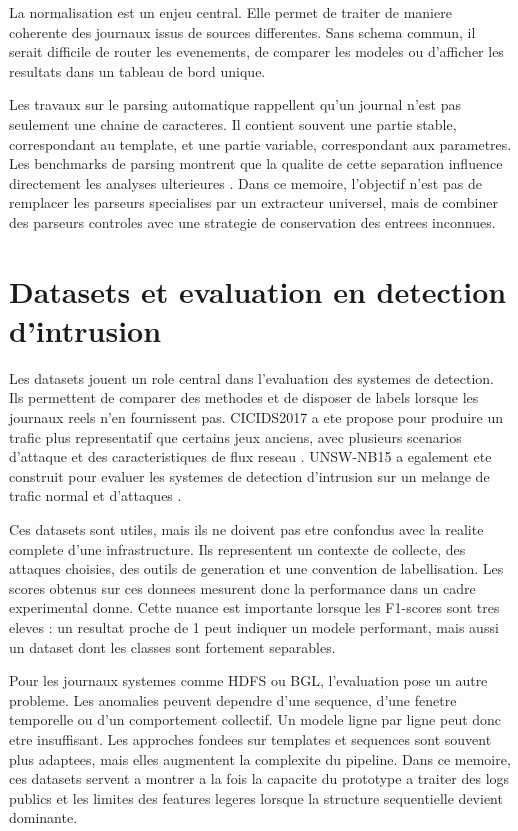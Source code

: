 La normalisation est un enjeu central. Elle permet de traiter de maniere coherente des journaux issus de sources differentes. Sans schema commun, il serait difficile de router les evenements, de comparer les modeles ou d'afficher les resultats dans un tableau de bord unique.

Les travaux sur le parsing automatique rappellent qu'un journal n'est pas seulement une chaine de caracteres. Il contient souvent une partie stable, correspondant au template, et une partie variable, correspondant aux parametres. Les benchmarks de parsing montrent que la qualite de cette separation influence directement les analyses ulterieures \cite{zhu2019logparser}. Dans ce memoire, l'objectif n'est pas de remplacer les parseurs specialises par un extracteur universel, mais de combiner des parseurs controles avec une strategie de conservation des entrees inconnues.

\section{Datasets et evaluation en detection d'intrusion}
Les datasets jouent un role central dans l'evaluation des systemes de detection. Ils permettent de comparer des methodes et de disposer de labels lorsque les journaux reels n'en fournissent pas. CICIDS2017 a ete propose pour produire un trafic plus representatif que certains jeux anciens, avec plusieurs scenarios d'attaque et des caracteristiques de flux reseau \cite{sharafaldin2018cicids}. UNSW-NB15 a egalement ete construit pour evaluer les systemes de detection d'intrusion sur un melange de trafic normal et d'attaques \cite{moustafa2015unsw}.

Ces datasets sont utiles, mais ils ne doivent pas etre confondus avec la realite complete d'une infrastructure. Ils representent un contexte de collecte, des attaques choisies, des outils de generation et une convention de labellisation. Les scores obtenus sur ces donnees mesurent donc la performance dans un cadre experimental donne. Cette nuance est importante lorsque les F1-scores sont tres eleves : un resultat proche de 1 peut indiquer un modele performant, mais aussi un dataset dont les classes sont fortement separables.

Pour les journaux systemes comme HDFS ou BGL, l'evaluation pose un autre probleme. Les anomalies peuvent dependre d'une sequence, d'une fenetre temporelle ou d'un comportement collectif. Un modele ligne par ligne peut donc etre insuffisant. Les approches fondees sur templates et sequences sont souvent plus adaptees, mais elles augmentent la complexite du pipeline. Dans ce memoire, ces datasets servent a montrer a la fois la capacite du prototype a traiter des logs publics et les limites des features legeres lorsque la structure sequentielle devient dominante.


